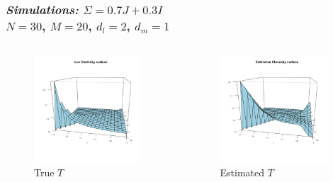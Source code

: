 \documentclass[12pt]{beamer}
\begin{document}
\begin{frame}
\frametitle{\emph{Simulations: }$\Sigma = 0.7J + 0.3I$\\
$N = 30$, $M=20$, $d_l = 2$, $d_m= 1$}

 \begin{columns}
\begin{column}{0.5\textwidth}
    \begin{center}
    \begin{figure}
    \graphicspath{{img/}}
 \includegraphics[width=4cm]{compound-symmetry-true-cholesky}
 \caption{True $T$ }
 \end{figure}
     \end{center}
  \end{column}
\begin{column}{0.5\textwidth}  %
    \begin{center}
    \begin{figure}
    \graphicspath{{img/}}
 \includegraphics[width=4cm]{compound-symmetry-estimated-cholesky}
 \caption{Estimated $T$}
 \end{figure}
     \end{center}
\end{column}
\end{columns}


\end{frame}
\end{document}
